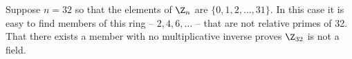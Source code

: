 \begin{example}
Suppose $n = 32$ so that the elements of 
$\Z_n$ %
are $\{0,1,2,\ldots, 31\}$.
In this case it is easy to find members of this ring %
-- \eg $2, 4, 6,\ldots$ -- that are not relative primes of 32.  
That there exists a member with no multiplicative inverse 
proves $\Z_{32}$ is not a field.
\end{example}


